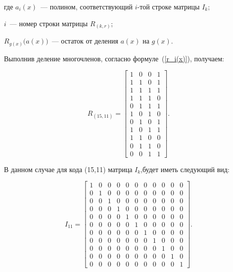 \begin{ESKDexplanation}
\item[где ] $a_i(x)$~--- полином, соответствующий $i$-той строке
  матрицы $I_k$;
\item $i$~--- номер строки матрицы $R_{(k, r)}$;
\item $R_{g(x)}\bigl(a(x)\bigr)$~--- остаток от деления $a(x)$ на $g(x)$.
\end{ESKDexplanation}

Выполнив деление многочленов, согласно формуле~(\ref{r_i(x)}),
получаем:

\begin{equation*}
  R_{(15, 11)} =  \left[
    \begin{array}{cccc}
      1 & 0 & 0 & 1 \\
      1 & 1 & 0 & 1 \\
      1 & 1 & 1 & 1 \\
      1 & 1 & 1 & 0 \\
      0 & 1 & 1 & 1 \\
      1 & 0 & 1 & 0 \\
      0 & 1 & 0 & 1 \\
      1 & 0 & 1 & 1 \\
      1 & 1 & 0 & 0 \\
      0 & 1 & 1 & 0 \\
      0 & 0 & 1 & 1  
    \end{array}
  \right].
\end{equation*}


В данном случае для кода (15,11) матрица $I_k$,будет иметь следующий
вид:

\begin{equation*}
  I_{11} =  \left[
    \begin{array}{cccccccccccc}
      1 & 0 & 0 & 0 & 0 & 0 & 0 & 0 & 0 & 0 & 0\\
      0 & 1 & 0 & 0 & 0 & 0 & 0 & 0 & 0 & 0 & 0\\
      0 & 0 & 1 & 0 & 0 & 0 & 0 & 0 & 0 & 0 & 0\\
      0 & 0 & 0 & 1 & 0 & 0 & 0 & 0 & 0 & 0 & 0\\
      0 & 0 & 0 & 0 & 1 & 0 & 0 & 0 & 0 & 0 & 0\\
      0 & 0 & 0 & 0 & 0 & 1 & 0 & 0 & 0 & 0 & 0\\
      0 & 0 & 0 & 0 & 0 & 0 & 1 & 0 & 0 & 0 & 0\\
      0 & 0 & 0 & 0 & 0 & 0 & 0 & 1 & 0 & 0 & 0\\
      0 & 0 & 0 & 0 & 0 & 0 & 0 & 0 & 1 & 0 & 0\\
      0 & 0 & 0 & 0 & 0 & 0 & 0 & 0 & 0 & 1 & 0\\
      0 & 0 & 0 & 0 & 0 & 0 & 0 & 0 & 0 & 0 & 1 
    \end{array}
  \right].
\end{equation*}

